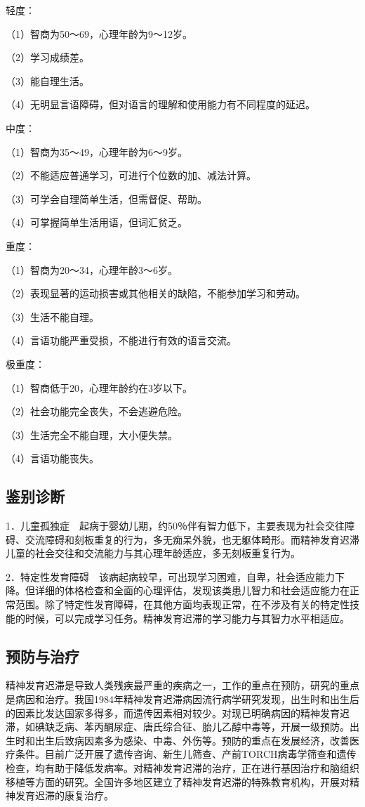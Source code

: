 轻度：

（1）智商为50～69，心理年龄为9～12岁。

（2）学习成绩差。

（3）能自理生活。

（4）无明显言语障碍，但对语言的理解和使用能力有不同程度的延迟。

中度：

（1）智商为35～49，心理年龄为6～9岁。

（2）不能适应普通学习，可进行个位数的加、减法计算。

（3）可学会自理简单生活，但需督促、帮助。

（4）可掌握简单生活用语，但词汇贫乏。

重度：

（1）智商为20～34，心理年龄3～6岁。

（2）表现显著的运动损害或其他相关的缺陷，不能参加学习和劳动。

（3）生活不能自理。

（4）言语功能严重受损，不能进行有效的语言交流。

极重度：

（1）智商低于20，心理年龄约在3岁以下。

（2）社会功能完全丧失，不会逃避危险。

（3）生活完全不能自理，大小便失禁。

（4）言语功能丧失。

\subsection{鉴别诊断}

1．儿童孤独症　起病于婴幼儿期，约50％伴有智力低下，主要表现为社会交往障碍、交流障碍和刻板重复的行为，多无痴呆外貌，也无躯体畸形。而精神发育迟滞儿童的社会交往和交流能力与其心理年龄适应，多无刻板重复行为。

2．特定性发育障碍　该病起病较早，可出现学习困难，自卑，社会适应能力下降。但详细的体格检查和全面的心理评估，发现该类患儿智力和社会适应能力在正常范围。除了特定性发育障碍，在其他方面均表现正常，在不涉及有关的特定性技能的时候，可以完成学习任务。精神发育迟滞的学习能力与其智力水平相适应。

\subsection{预防与治疗}

精神发育迟滞是导致人类残疾最严重的疾病之一，工作的重点在预防，研究的重点是病因和治疗。我国1984年精神发育迟滞病因流行病学研究发现，出生时和出生后的因素比发达国家多得多，而遗传因素相对较少。对现已明确病因的精神发育迟滞，如碘缺乏病、苯丙酮尿症、唐氏综合征、胎儿乙醇中毒等，开展一级预防。出生时和出生后致病因素多为感染、中毒、外伤等。预防的重点在发展经济，改善医疗条件。目前广泛开展了遗传咨询、新生儿筛查、产前TORCH病毒学筛查和遗传检查，均有助于降低发病率。对精神发育迟滞的治疗，正在进行基因治疗和脑组织移植等方面的研究。全国许多地区建立了精神发育迟滞的特殊教育机构，开展对精神发育迟滞的康复治疗。

